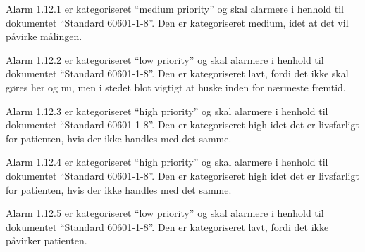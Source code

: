 Alarm 1.12.1 er kategoriseret “medium priority” og skal alarmere i henhold til dokumentet “Standard 60601-1-8”. Den er kategoriseret medium, idet at det vil påvirke målingen. 

Alarm 1.12.2 er kategoriseret “low priority” og skal alarmere i henhold til dokumentet “Standard 60601-1-8”. Den er kategoriseret lavt, fordi det ikke skal gøres her og nu, men i stedet blot vigtigt at huske inden for nærmeste fremtid.

Alarm 1.12.3 er kategoriseret “high priority” og skal alarmere i henhold til dokumentet “Standard 60601-1-8”. Den er kategoriseret high idet det er livsfarligt for patienten, hvis der ikke handles med det samme.

Alarm 1.12.4 er kategoriseret “high priority” og skal alarmere i henhold til dokumentet “Standard 60601-1-8”. Den er kategoriseret high idet det er livsfarligt for patienten, hvis der ikke handles med det samme.

Alarm 1.12.5 er kategoriseret “low priority” og skal alarmere i henhold til dokumentet “Standard 60601-1-8”. Den er kategoriseret lavt, fordi det ikke påvirker patienten.
